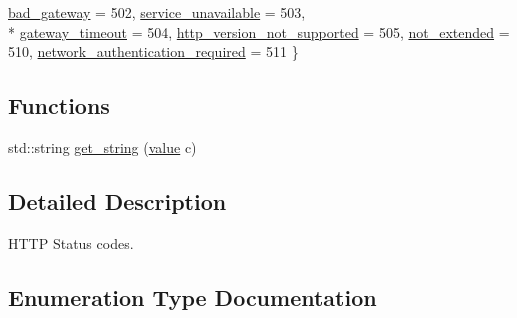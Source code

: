 \begin{DoxyCompactItemize}
\hyperlink{namespacewebsocketpp_1_1http_1_1status__code_ae0d61c309e053ee5673517b54e2886c6a094a47b6e0375c3b9dbc1b4fa0375022}{bad\+\_\+gateway} = 502, 
\hyperlink{namespacewebsocketpp_1_1http_1_1status__code_ae0d61c309e053ee5673517b54e2886c6adc6e54e6798f6d6794f17ba4989eaf47}{service\+\_\+unavailable} = 503, 
\\*
\hyperlink{namespacewebsocketpp_1_1http_1_1status__code_ae0d61c309e053ee5673517b54e2886c6a32f873bb9446c5a936918f5c864715e2}{gateway\+\_\+timeout} = 504, 
\hyperlink{namespacewebsocketpp_1_1http_1_1status__code_ae0d61c309e053ee5673517b54e2886c6a9afd47c5a1e85fd20e48748478ec3aae}{http\+\_\+version\+\_\+not\+\_\+supported} = 505, 
\hyperlink{namespacewebsocketpp_1_1http_1_1status__code_ae0d61c309e053ee5673517b54e2886c6ac115be5406ae880a1e5c989efd227095}{not\+\_\+extended} = 510, 
\hyperlink{namespacewebsocketpp_1_1http_1_1status__code_ae0d61c309e053ee5673517b54e2886c6afad7dbd19a722abed684e80d8a0ee263}{network\+\_\+authentication\+\_\+required} = 511
 \}
\end{DoxyCompactItemize}
\subsection*{Functions}
\begin{DoxyCompactItemize}
\item 
std\+::string \hyperlink{namespacewebsocketpp_1_1http_1_1status__code_a883bc82f3dce18b493ba7a5252603ba6}{get\+\_\+string} (\hyperlink{namespacewebsocketpp_1_1http_1_1status__code_ae0d61c309e053ee5673517b54e2886c6}{value} c)
\end{DoxyCompactItemize}


\subsection{Detailed Description}
H\+T\+T\+P Status codes. 

\subsection{Enumeration Type Documentation}
\hypertarget{namespacewebsocketpp_1_1http_1_1status__code_ae0d61c309e053ee5673517b54e2886c6}{}
